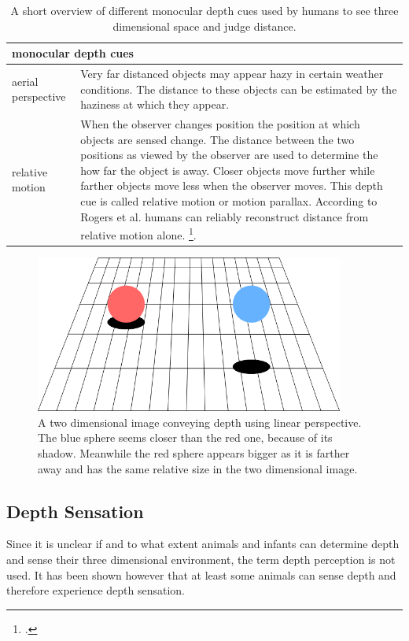 \begin{table}[h!]
	\begin{tabularx}{\textwidth}{|l|X|}
		\hline
		\multicolumn{2}{|l|}{\textbf{monocular depth cues}} \\
		\hline
		aerial perspective & Very far distanced objects may appear hazy in certain weather conditions. The distance to these objects can be estimated by the haziness at which they appear.
		\\
		\hline
		relative motion & When the observer changes position the position at which objects are sensed change. The distance between the two positions as viewed by the observer are used to determine the how far the object is away. Closer objects move further while farther objects move less when the observer moves. This depth cue is called relative motion or motion parallax. According to Rogers et al. humans can reliably reconstruct distance from relative motion alone. \footcite{Rogers_Motion_parallax_as_an_independent_cue_for_depth_perception}.
		\\
		\hline
	\end{tabularx}
	\label{tab:study_of_literature_monocular_depth_cues2}
	\caption{A short overview of different monocular depth cues used by humans to see three dimensional space and judge distance.}
\end{table}

\begin{figure}[h!]
	\centering
	\includegraphics[width=4in]{img/study_of_literature_depth_perception_two_shperes.png}
	\caption{A two dimensional image conveying depth using linear perspective. The blue sphere seems closer than the red one, because of its shadow. Meanwhile the red sphere appears bigger as it is farther away and has the same relative size in the two dimensional image.}
	\label{pic:study_of_literature_depth_perception_two_shperes}
\end{figure}

\newpage

\subsection{Depth Sensation}
Since it is unclear if and to what extent animals and infants can determine depth and sense their three dimensional environment, the term depth perception is not used. It has been shown however that at least some animals can sense depth and therefore experience depth sensation.

